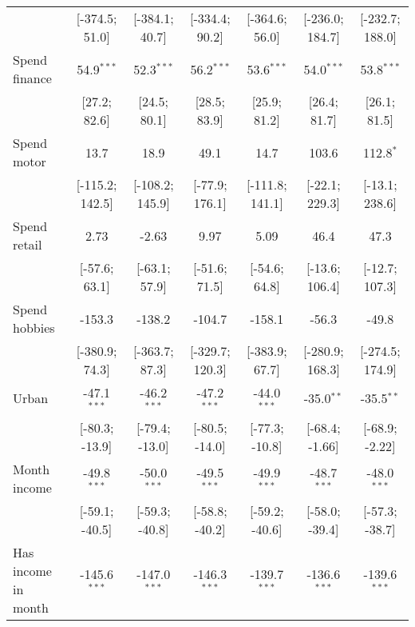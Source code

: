 \begin{table}[htbp]
\begin{threeparttable}[b]
\begin{tabular}{lcccccc}
                                   & [-374.5; 51.0]   & [-384.1; 40.7]   & [-334.4; 90.2]   & [-364.6; 56.0]   & [-236.0; 184.7]  & [-232.7; 188.0]\\   
         Spend finance             & 54.9$^{***}$     & 52.3$^{***}$     & 56.2$^{***}$     & 53.6$^{***}$     & 54.0$^{***}$     & 53.8$^{***}$\\   
                                   & [27.2; 82.6]     & [24.5; 80.1]     & [28.5; 83.9]     & [25.9; 81.2]     & [26.4; 81.7]     & [26.1; 81.5]\\   
         Spend motor               & 13.7             & 18.9             & 49.1             & 14.7             & 103.6            & 112.8$^{*}$\\   
                                   & [-115.2; 142.5]  & [-108.2; 145.9]  & [-77.9; 176.1]   & [-111.8; 141.1]  & [-22.1; 229.3]   & [-13.1; 238.6]\\   
         Spend retail              & 2.73             & -2.63            & 9.97             & 5.09             & 46.4             & 47.3\\   
                                   & [-57.6; 63.1]    & [-63.1; 57.9]    & [-51.6; 71.5]    & [-54.6; 64.8]    & [-13.6; 106.4]   & [-12.7; 107.3]\\   
         Spend hobbies             & -153.3           & -138.2           & -104.7           & -158.1           & -56.3            & -49.8\\   
                                   & [-380.9; 74.3]   & [-363.7; 87.3]   & [-329.7; 120.3]  & [-383.9; 67.7]   & [-280.9; 168.3]  & [-274.5; 174.9]\\   
         Urban                     & -47.1$^{***}$    & -46.2$^{***}$    & -47.2$^{***}$    & -44.0$^{***}$    & -35.0$^{**}$     & -35.5$^{**}$\\   
                                   & [-80.3; -13.9]   & [-79.4; -13.0]   & [-80.5; -14.0]   & [-77.3; -10.8]   & [-68.4; -1.66]   & [-68.9; -2.22]\\   
         Month income              & -49.8$^{***}$    & -50.0$^{***}$    & -49.5$^{***}$    & -49.9$^{***}$    & -48.7$^{***}$    & -48.0$^{***}$\\   
                                   & [-59.1; -40.5]   & [-59.3; -40.8]   & [-58.8; -40.2]   & [-59.2; -40.6]   & [-58.0; -39.4]   & [-57.3; -38.7]\\   
         Has income in month       & -145.6$^{***}$   & -147.0$^{***}$   & -146.3$^{***}$   & -139.7$^{***}$   & -136.6$^{***}$   & -139.6$^{***}$\\   

\end{tabular}
\end{threeparttable}
\end{table}
